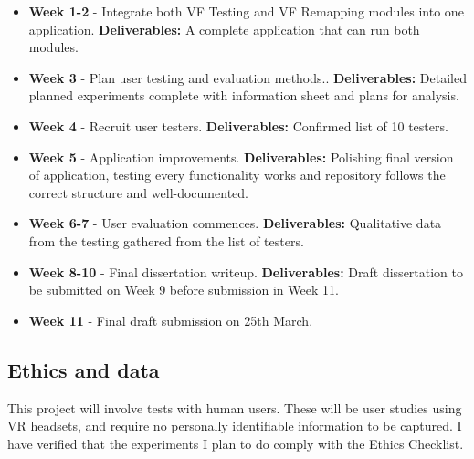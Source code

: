 \documentclass[11pt]{article}
\begin{document}
\begin{itemize}
    \item   \textbf{Week 1-2} - Integrate both VF Testing and VF Remapping modules into one application. \textbf{Deliverables: } A complete application that can run both modules.
    
    \item   \textbf{Week 3} - Plan user testing and evaluation methods.. \textbf{Deliverables: } Detailed planned experiments complete with information sheet and plans for analysis.
    
    \item   \textbf{Week 4} - Recruit user testers. \textbf{Deliverables: } Confirmed list of 10 testers.
    
    \item   \textbf{Week 5} - Application improvements. \textbf{Deliverables: } Polishing final version of application, testing every functionality works and repository follows the correct structure and well-documented.
    
    \item   \textbf{Week 6-7} - User evaluation commences. \textbf{Deliverables: } Qualitative data from the testing gathered from the list of testers.
    
    \item   \textbf{Week 8-10} - Final dissertation writeup. \textbf{Deliverables: } Draft dissertation to be submitted on Week 9 before submission in Week 11.
    
    \item   \textbf{Week 11} - Final draft submission on 25th March.
\end{itemize}
    
\subsection{Ethics and data}\label{ethics}

This project will involve tests with human users. These will be user studies
using VR headsets, and require no personally identifiable information to be captured.
I have verified that the experiments I plan to do comply with the Ethics Checklist.
\end{document}
